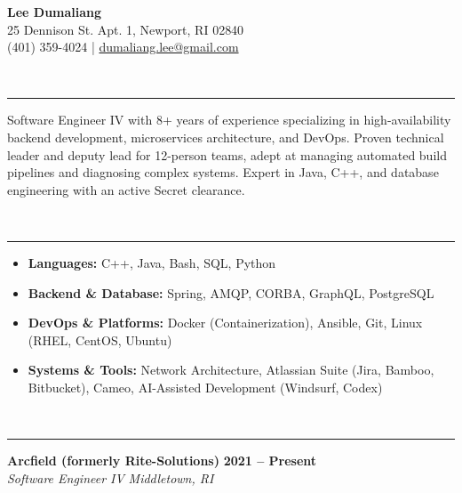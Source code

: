 \documentclass[10pt,letterpaper]{article}
\begin{document}
\begin{center}
    {\Huge \textbf{Lee Dumaliang}} \\
    \vspace{2pt}
    \small 25 Dennison St. Apt. 1, Newport, RI 02840 \\
    (401) 359-4024 \quad | \quad \href{mailto:dumaliang.lee@gmail.com}{dumaliang.lee@gmail.com}
\end{center}

\vspace{4pt}

 \\[-6pt]
\rule{\textwidth}{0.8pt}

\noindent Software Engineer IV with 8+ years of experience specializing in high-availability backend development, microservices architecture, and DevOps. Proven technical leader and deputy lead for 12-person teams, adept at managing automated build pipelines and diagnosing complex systems. Expert in Java, C++, and database engineering with an active Secret clearance.

\vspace{4pt}

 \\[-6pt]
\rule{\textwidth}{0.8pt}
\begin{itemize}[leftmargin=*, label={$\bullet$}, itemsep=0.5pt, topsep=0pt, parsep=0pt]
    \item \textbf{Languages:} C++, Java, Bash, SQL, Python
    \item \textbf{Backend \& Database:} Spring, AMQP, CORBA, GraphQL, PostgreSQL
    \item \textbf{DevOps \& Platforms:} Docker (Containerization), Ansible, Git, Linux (RHEL, CentOS, Ubuntu)
    \item \textbf{Systems \& Tools:} Network Architecture, Atlassian Suite (Jira, Bamboo, Bitbucket), Cameo, AI-Assisted Development (Windsurf, Codex)
\end{itemize}

\vspace{4pt}

 \\[-6pt]
\rule{\textwidth}{0.8pt}

\noindent \textbf{Arcfield (formerly Rite-Solutions)} \hfill \textbf{2021 -- Present} \\
\textit{Software Engineer IV} \hfill \textit{Middletown, RI}
\end{document}
